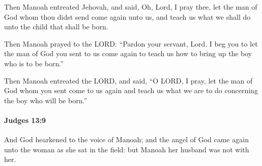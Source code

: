 			\begin{versebox}
					\item[BHS] 
					\item[ASV] Then Manoah entreated Jehovah, and said, Oh, Lord, I pray thee, let the man of God whom thou didst send come again unto us, and teach us what we shall do unto the child that shall be born.
					\item[NIV] Then Manoah prayed to the LORD: “Pardon your servant, Lord. I beg you to let the man of God you sent to us come again to teach us how to bring up the boy who is to be born.”
					\item[NRSV] Then Manoah entreated the LORD, and said, “O LORD, I pray, let the man of God whom you sent come to us again and teach us what we are to do concerning the boy who will be born.”
			\end{versebox}

		\paragraph{Judges 13:9} %
			\label{JUDGES-13-9}

			And God hearkened to the voice of Manoah; and the angel of God came again unto the woman as she sat in the field: but Manoah her husband was not with her.

